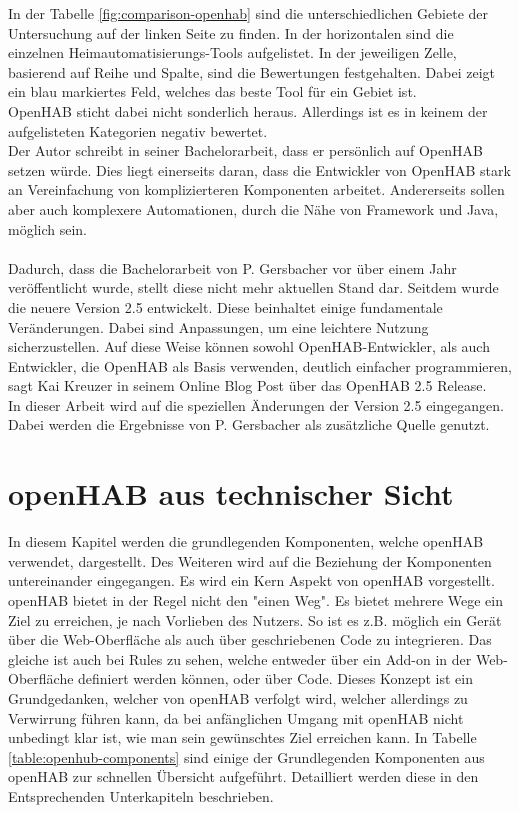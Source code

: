 In der Tabelle \ref{fig:comparison-openhab} sind die unterschiedlichen Gebiete der Untersuchung auf der linken Seite zu finden. In der horizontalen sind die einzelnen Heimautomatisierungs-Tools aufgelistet. In der jeweiligen Zelle, basierend auf Reihe und Spalte, sind die Bewertungen festgehalten. Dabei zeigt ein blau markiertes Feld, welches das beste Tool für ein Gebiet ist.\\
OpenHAB sticht dabei nicht sonderlich heraus. Allerdings ist es in keinem der aufgelisteten Kategorien negativ bewertet.\\
Der Autor schreibt in seiner Bachelorarbeit, dass er persönlich auf OpenHAB setzen würde. Dies liegt einerseits daran, dass die Entwickler von OpenHAB stark an Vereinfachung von komplizierteren Komponenten arbeitet. Andererseits sollen aber auch komplexere Automationen, durch die Nähe von Framework und Java, möglich sein.\cite{BA01:OPH}
\\
\\
Dadurch, dass die Bachelorarbeit von P. Gersbacher vor über einem Jahr veröffentlicht wurde, stellt diese nicht mehr aktuellen Stand dar. Seitdem wurde die neuere Version 2.5 entwickelt. Diese beinhaltet einige fundamentale Veränderungen. Dabei sind Anpassungen, um eine leichtere Nutzung sicherzustellen. Auf diese Weise können sowohl OpenHAB-Entwickler, als auch Entwickler, die OpenHAB als Basis verwenden, deutlich einfacher programmieren, sagt Kai Kreuzer in seinem Online Blog Post über das OpenHAB 2.5 Release.\cite{OPENHAB02:OH}\\
In dieser Arbeit wird auf die speziellen Änderungen der Version 2.5 eingegangen. Dabei werden die Ergebnisse von P. Gersbacher als zusätzliche Quelle genutzt.


\section{openHAB aus technischer Sicht}
In diesem Kapitel werden die grundlegenden Komponenten, welche openHAB verwendet, dargestellt. Des Weiteren wird auf die  Beziehung der Komponenten untereinander eingegangen. 
Es wird ein Kern Aspekt von openHAB vorgestellt. openHAB bietet in der Regel nicht den "einen Weg". Es bietet mehrere Wege ein Ziel zu erreichen, je nach Vorlieben des Nutzers. So ist es z.B. möglich ein Gerät über die Web-Oberfläche als auch über geschriebenen Code zu integrieren. Das gleiche ist auch bei Rules zu sehen, welche entweder über ein Add-on in der Web-Oberfläche definiert werden können, oder über Code. Dieses Konzept ist ein Grundgedanken, welcher von openHAB verfolgt wird, welcher allerdings zu Verwirrung führen kann, da bei anfänglichen Umgang mit openHAB nicht unbedingt klar ist, wie man sein gewünschtes Ziel erreichen kann.
In Tabelle \ref{table:openhub-components} sind einige der Grundlegenden Komponenten aus openHAB zur schnellen Übersicht aufgeführt. Detailliert werden diese in den Entsprechenden Unterkapiteln beschrieben.

